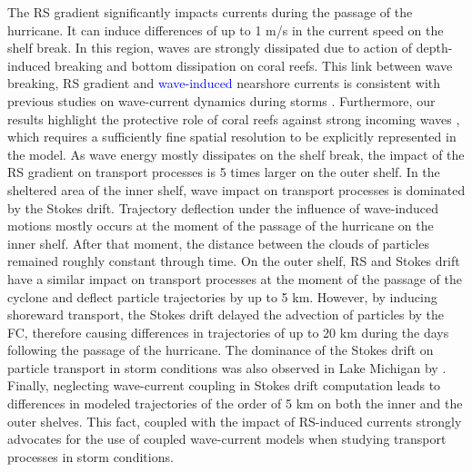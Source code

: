 \documentclass[preprint,12pt,authoryear]{elsarticle}
\newcommand{\modif}[1]{\textcolor{blue}{#1}}
\begin{document}
The RS gradient significantly impacts currents during the passage of the hurricane. It can induce differences of up to 1 m/s in the current speed on the shelf break. In this region, waves are strongly dissipated due to action of depth-induced breaking and bottom dissipation on coral reefs. This link between wave breaking, RS gradient and \modif{wave-induced} nearshore currents is consistent with previous studies on wave-current dynamics during storms \citep{mao2017dynamics,mao2018wave,mao2020particle}. Furthermore, our results highlight the protective role of coral reefs against strong incoming waves \citep{lowe2005spectral}, which requires a sufficiently fine spatial resolution to be explicitly represented in the model. As wave energy mostly dissipates on the shelf break, the impact of the RS gradient on transport processes is 5 times larger on the outer shelf. In the sheltered area of the inner shelf, wave impact on transport processes is dominated by the Stokes drift. Trajectory deflection under the influence of wave-induced motions mostly occurs at the moment of the passage of the hurricane on the inner shelf. After that moment, the distance between the clouds of particles remained roughly constant through time. On the outer shelf, RS and Stokes drift have a similar impact on transport processes at the moment of the passage of the cyclone and deflect particle trajectories by up to 5 km. However, by inducing shoreward transport, the Stokes drift delayed the advection of particles by the FC, therefore causing differences in trajectories of up to 20 km during the days following the passage of the hurricane. The dominance of the Stokes drift on particle transport in storm conditions was also observed in Lake Michigan by \cite{mao2020particle}. Finally, neglecting wave-current coupling in Stokes drift computation leads to differences in modeled trajectories of the order of 5 km on both the inner and the outer shelves. This fact, coupled with the impact of RS-induced currents strongly advocates for the use of coupled wave-current models when studying transport processes in storm conditions.

\end{document}
